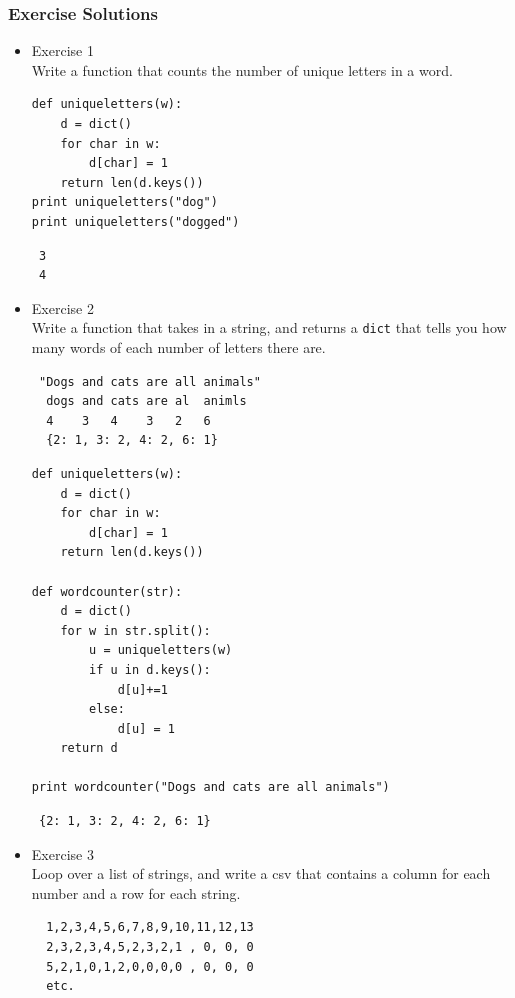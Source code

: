 \documentclass[11pt]{article}
\begin{document}
\subsubsection{Exercise Solutions}
\label{sec-2-7-5}
\begin{itemize}

\item Exercise 1\\
\label{sec-2-7-5-1}%
Write a function that counts the number of unique letters in a word.


\begin{verbatim}
def uniqueletters(w):
    d = dict()
    for char in w:
        d[char] = 1
    return len(d.keys())
print uniqueletters("dog")
print uniqueletters("dogged")
\end{verbatim}

\begin{verbatim}
 3
 4
\end{verbatim}


\item Exercise 2\\
\label{sec-2-7-5-2}%
Write a function that takes in a string, and returns a \texttt{dict} that
tells you how many words of each number of letters there are.
\begin{verbatim}
 "Dogs and cats are all animals"
  dogs and cats are al  animls
  4    3   4    3   2   6
  {2: 1, 3: 2, 4: 2, 6: 1}
\end{verbatim}


\begin{verbatim}
def uniqueletters(w):
    d = dict()
    for char in w:
        d[char] = 1
    return len(d.keys())

def wordcounter(str):
    d = dict()
    for w in str.split():
        u = uniqueletters(w)
        if u in d.keys():           
            d[u]+=1
        else:
            d[u] = 1
    return d

print wordcounter("Dogs and cats are all animals")
\end{verbatim}

\begin{verbatim}
 {2: 1, 3: 2, 4: 2, 6: 1}
\end{verbatim}


\item Exercise 3\\
\label{sec-2-7-5-3}%
Loop over a list of strings, and write a csv that contains a column
for each number and a row for each string.
\begin{verbatim}
  1,2,3,4,5,6,7,8,9,10,11,12,13
  2,3,2,3,4,5,2,3,2,1 , 0, 0, 0
  5,2,1,0,1,2,0,0,0,0 , 0, 0, 0
  etc.
\end{verbatim}



\end{itemize}
\end{document}
